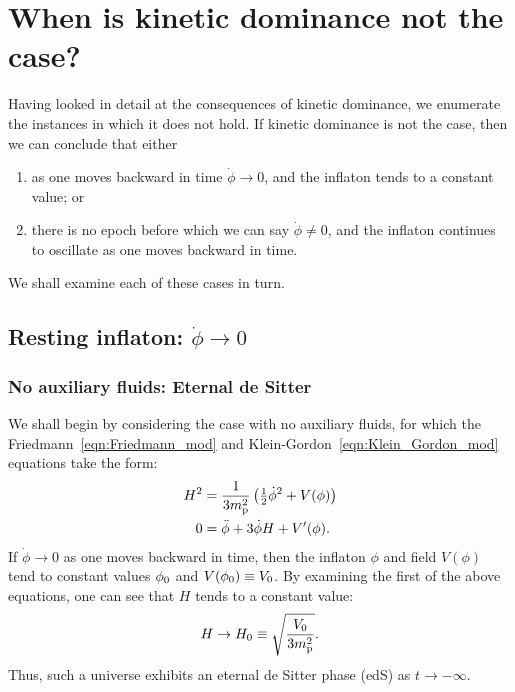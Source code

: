 \section{When is kinetic dominance not the case?}
\label{sec:When_is_kinetic_dominance_not_the_case?}
Having looked in detail at the consequences of kinetic dominance, we enumerate the instances in which it does not hold. If kinetic dominance is not the case, then we can conclude that either
%
\begin{enumerate}
    \item as one moves backward in time $\dot{\phi}\to 0$, and the inflaton tends to a constant value; or
    \item there is no epoch before which we can say $\dot{\phi}\ne 0$, and the inflaton continues to oscillate as one moves backward in time.
\end{enumerate}
%
We shall examine each of these cases in turn.

\subsection{Resting inflaton: $\dot{\phi}\to 0$}


\subsubsection{No auxiliary fluids: Eternal de Sitter}
We shall begin by considering the case with no auxiliary fluids, for which the Friedmann~\eqref{eqn:Friedmann_mod} and Klein-Gordon~\eqref{eqn:Klein_Gordon_mod} equations take the form:
%
\begin{align}
  H^2 
  &=
  \frac{1}{3m_{\mathrm{p}}^2}\left({\textstyle\frac{1}{2}}\dot{\phi}^2 + V(\phi) \right)
  \label{eqn:Friedmann_dotphi_to_zero_no_fluid} 
  \\
  0
  &=
  \ddot{\phi} +3\dot{\phi}H + V^\prime(\phi).
  \label{eqn:Klein_Gordon_dotphi_to_zero_no_fluid}
\end{align}
%
If $\dot{\phi}\to 0$ as one moves backward in time, then the inflaton $\phi$ and field $V(\phi)$ tend to constant values $\phi_0$ and $V(\phi_0)\equiv V_0$. By examining the first of the above equations, one can see that $H$ tends to a constant value:
%
\begin{equation}
  H\to H_0 \equiv \sqrt{\frac{V_0}{3m_{\mathrm{p}}^2}}.
\end{equation}
%
Thus, such a universe exhibits an eternal de Sitter phase (edS) as $t\to-\infty$.

